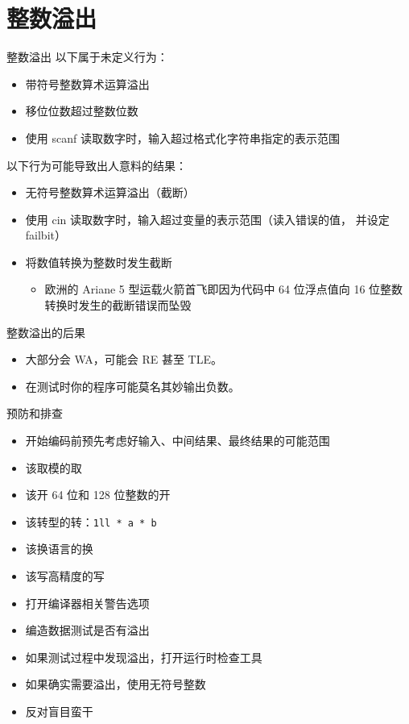 \documentclass[10pt,mathserif]{beamer}%
\begin{document}
\section{整数溢出}
\begin{frame}{整数溢出}
	以下属于未定义行为：
	\begin{itemize}
		\item 带符号整数算术运算溢出
		\item 移位位数超过整数位数
		\item 使用 scanf 读取数字时，输入超过格式化字符串指定的表示范围
	\end{itemize}
	以下行为可能导致出人意料的结果：
	\begin{itemize}
		\item 无符号整数算术运算溢出（截断）
		\item 使用 cin 读取数字时，输入超过变量的表示范围（读入错误的值，
			并设定 failbit）
		\item 将数值转换为整数时发生截断
			\begin{itemize}
				\item<2> 欧洲的 Ariane 5 型运载火箭首飞即因为代码中
					64 位浮点值向 16 位整数转换时发生的截断错误而坠毁
			\end{itemize}
	\end{itemize}
\end{frame}

\begin{frame}{整数溢出的后果}
	\begin{itemize}
		\item 大部分会 WA，可能会 RE 甚至 TLE。
		\item 在测试时你的程序可能莫名其妙输出负数。
	\end{itemize}
	
\end{frame}

\begin{frame}{预防和排查}
	\begin{itemize}
		\item 开始编码前预先考虑好输入、中间结果、最终结果的可能范围
		\item 该取模的取
		\item 该开 64 位和 128 位整数的开
		\item 该转型的转：\lstinline!1ll * a * b!
		\item 该换语言的换
		\item 该写高精度的写
		\item 打开编译器相关警告选项
		\item 编造数据测试是否有溢出
		\item 如果测试过程中发现溢出，打开运行时检查工具
		\item 如果确实需要溢出，使用无符号整数
		\item 反对盲目蛮干
	\end{itemize}
\end{frame}
\end{document}
